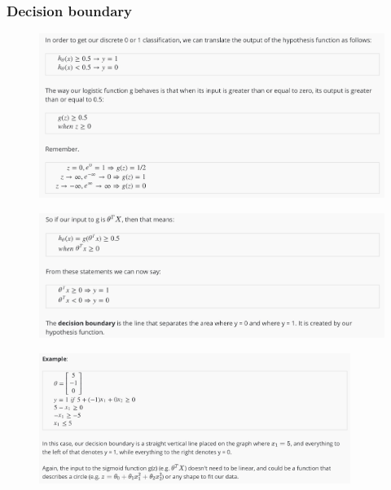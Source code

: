 \documentclass[12pt, A4,onecolumn]{article} %
\begin{document}
\subsubsection{Decision boundary}

\begin{figure}[H]
	\centering
	\includegraphics[width=1\textwidth]{./Imagenes/decBound1}
\end{figure}

\begin{figure}[H]
	\centering
	\includegraphics[width=1\textwidth]{./Imagenes/decBound2}
\end{figure}

\begin{figure}[H]
	\centering
	\includegraphics[width=0.9\textwidth]{./Imagenes/decBound3}
\end{figure}
\end{document}

